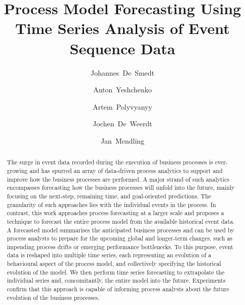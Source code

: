 \documentclass{svproc}
\begin{document}
\mainmatter
%
\title{Process Model Forecasting Using Time Series Analysis of Event Sequence Data}
%
%
\author{Johannes~De~Smedt \and Anton~Yeshchenko \and Artem~Polyvyanyy \and Jochen~De~Weerdt \and Jan~Mendling}
%
\maketitle

\begin{abstract}
The surge in event data recorded during the execution of business processes is ever-growing and has spurred an array of data-driven process analytics to support and improve how the business processes are performed.
A major strand of such analytics encompasses forecasting how the business processes will unfold into the future, mainly focusing on the next-step, remaining time, and goal-oriented predictions.
The granularity of such approaches lies with the individual events in the process.
In contrast, this work approaches process forecasting at a larger scale and proposes a technique to forecast the entire process model from the available historical event data.
A forecasted model summarises the anticipated business processes and can be used by process analysts to prepare for the upcoming global and longer-term changes, such as impending process drifts or emerging performance bottlenecks.
To this purpose, event data is reshaped into multiple time series, each representing an evolution of a behavioural aspect of the process model, and collectively specifying the historical evolution of the model.
We then perform time series forecasting to extrapolate the individual series and, concomitantly, the entire model into the future.
Experiments confirm that this approach is capable of informing process analysts about the future evolution of the business processes.
\end{abstract}
%




%
\end{document}
